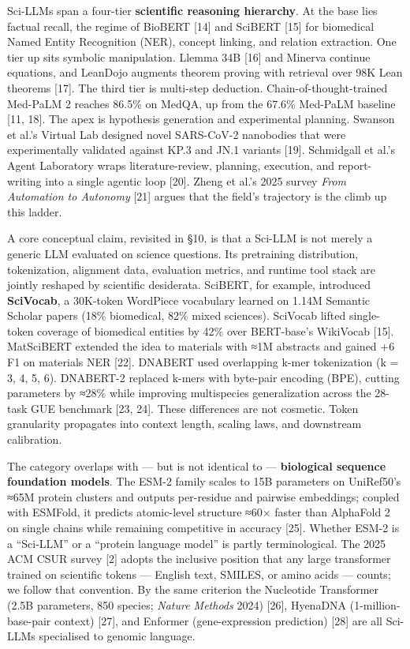 Sci-LLMs span a four-tier \textbf{scientific reasoning hierarchy}. At the base lies factual recall, the regime of BioBERT {[}14{]} and SciBERT {[}15{]} for biomedical Named Entity Recognition (NER), concept linking, and relation extraction. One tier up sits symbolic manipulation. Llemma 34B {[}16{]} and Minerva continue equations, and LeanDojo augments theorem proving with retrieval over 98K Lean theorems {[}17{]}. The third tier is multi-step deduction. Chain-of-thought-trained Med-PaLM 2 reaches 86.5\% on MedQA, up from the 67.6\% Med-PaLM baseline {[}11, 18{]}. The apex is hypothesis generation and experimental planning. Swanson et al.'s Virtual Lab designed novel SARS-CoV-2 nanobodies that were experimentally validated against KP.3 and JN.1 variants {[}19{]}. Schmidgall et al.'s Agent Laboratory wraps literature-review, planning, execution, and report-writing into a single agentic loop {[}20{]}. Zheng et al.'s 2025 survey \emph{From Automation to Autonomy} {[}21{]} argues that the field's trajectory is the climb up this ladder.

A core conceptual claim, revisited in §10, is that a Sci-LLM is not merely a generic LLM evaluated on science questions. Its pretraining distribution, tokenization, alignment data, evaluation metrics, and runtime tool stack are jointly reshaped by scientific desiderata. SciBERT, for example, introduced \textbf{SciVocab}, a 30K-token WordPiece vocabulary learned on 1.14M Semantic Scholar papers (18\% biomedical, 82\% mixed sciences). SciVocab lifted single-token coverage of biomedical entities by 42\% over BERT-base's WikiVocab {[}15{]}. MatSciBERT extended the idea to materials with ≈1M abstracts and gained +6 F1 on materials NER {[}22{]}. DNABERT used overlapping k-mer tokenization (k = 3, 4, 5, 6). DNABERT-2 replaced k-mers with byte-pair encoding (BPE), cutting parameters by ≈28\% while improving multispecies generalization across the 28-task GUE benchmark {[}23, 24{]}. These differences are not cosmetic. Token granularity propagates into context length, scaling laws, and downstream calibration.

The category overlaps with --- but is not identical to --- \textbf{biological sequence foundation models}. The ESM-2 family scales to 15B parameters on UniRef50's ≈65M protein clusters and outputs per-residue and pairwise embeddings; coupled with ESMFold, it predicts atomic-level structure ≈60× faster than AlphaFold 2 on single chains while remaining competitive in accuracy {[}25{]}. Whether ESM-2 is a ``Sci-LLM'' or a ``protein language model'' is partly terminological. The 2025 ACM CSUR survey {[}2{]} adopts the inclusive position that any large transformer trained on scientific tokens --- English text, SMILES, or amino acids --- counts; we follow that convention. By the same criterion the Nucleotide Transformer (2.5B parameters, 850 species; \emph{Nature Methods} 2024) {[}26{]}, HyenaDNA (1-million-base-pair context) {[}27{]}, and Enformer (gene-expression prediction) {[}28{]} are all Sci-LLMs specialised to genomic language.


